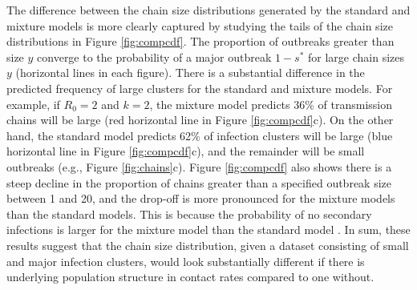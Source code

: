 \documentclass{imammb}
\numberwithin{equation}{section}
\begin{document}
The difference between the chain size distributions generated by the standard and mixture models is more clearly captured by studying the tails of the chain size distributions in  Figure \ref{fig:compcdf}. The proportion of outbreaks greater than size $y$  converge to the probability of a major outbreak $1-s^*$ for large chain sizes $y$ (horizontal lines in each figure). There is a substantial difference in the predicted frequency of large clusters for the standard and mixture models.
For example, if $R_0=2$ and $k=2$, the mixture model predicts 36\% of transmission chains will be large (red horizontal line in  Figure \ref{fig:compcdf}c). On the other hand, the standard model predicts 62\% of infection clusters will be large (blue horizontal line in  Figure \ref{fig:compcdf}c), and the remainder will be small outbreaks (e.g., Figure \ref{fig:chains}c). Figure \ref{fig:compcdf} also shows there is a steep decline in the proportion of chains greater than a specified outbreak size between 1 and 20, and the drop-off is more pronounced for the mixture models than the standard models. This is because the probability of no secondary infections is larger for the mixture model than the standard model \citep{Garske2008-ax}.  In sum, these results suggest that the chain size distribution, given a dataset consisting of small and major infection clusters, would look substantially different if there is underlying population structure in contact rates compared to one without. %

\end{document}

